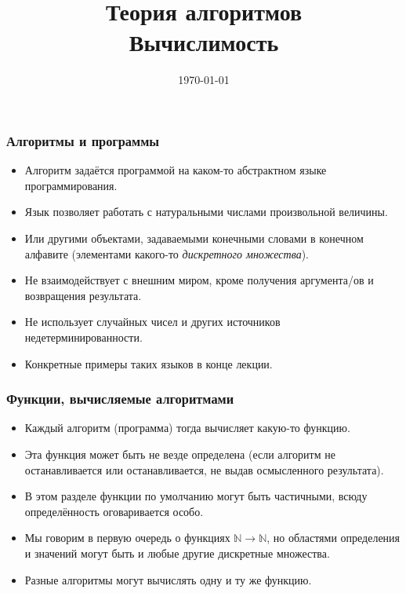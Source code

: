 \documentclass[10pt]{beamer}
\title{Теория алгоритмов\\Вычислимость}
\date{\today}
\begin{document}
\begin{frame}[plain]
\maketitle
\end{frame}

\begin{frame}
    \frametitle{Алгоритмы и программы}
    \begin{itemize}
        \item Алгоритм задаётся программой на каком-то абстрактном языке программирования.
        \item Язык позволяет работать с натуральными числами произвольной величины.
        \item Или другими объектами, задаваемыми конечными словами в конечном алфавите (элементами какого-то \emph{дискретного множества}).
        \item Не взаимодействует с внешним миром, кроме получения аргумента/ов и возвращения результата.
        \item Не использует случайных чисел и других источников недетерминированности.
        \item Конкретные примеры таких языков в конце лекции.
    \end{itemize}
\end{frame}

\begin{frame}
    \frametitle{Функции, вычисляемые алгоритмами}
    \begin{itemize}
        \item Каждый алгоритм (программа) тогда вычисляет какую-то функцию.
        \item Эта функция может быть не везде определена (если алгоритм не останавливается или останавливается, не выдав осмысленного результата).
        \item В этом разделе функции по умолчанию могут быть частичными, всюду определённость оговаривается особо.
        \item Мы говорим в первую очередь о функциях $\mathbb{N} \to \mathbb{N}$, но областями определения и значений могут быть и любые другие дискретные множества.
        \item Разные алгоритмы могут вычислять одну и ту же функцию.
    \end{itemize}
\end{frame}
\end{document}
